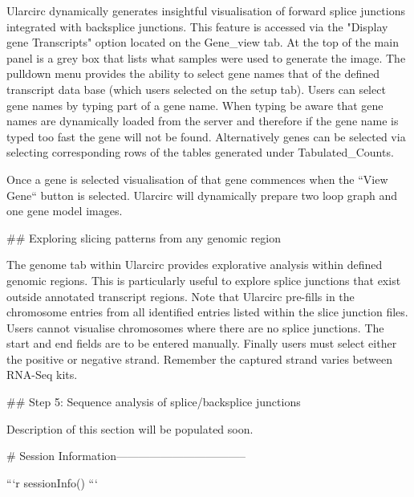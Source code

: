 Ularcirc dynamically generates insightful visualisation of forward splice junctions integrated with backsplice junctions. This feature is accessed via the "Display gene Transcripts" option located on the Gene_view tab. At the top of the main panel is a grey box that lists what samples were used to generate the image. The pulldown menu provides the ability to select gene names that of the defined transcript data base (which users selected on the setup tab). Users can select gene names by typing part of a gene name. When typing  be aware that gene names are dynamically loaded from the server and therefore if the gene name is typed too fast the gene will not be found.  Alternatively genes can be selected via selecting corresponding rows of the tables generated under Tabulated_Counts. 

Once a gene is selected visualisation of that gene commences when the ``View Gene`` button is selected. Ularcirc will dynamically prepare two loop graph and one gene model images.


## Exploring slicing patterns from any genomic region

The genome tab within Ularcirc provides explorative analysis within defined genomic regions. This is particularly useful to explore splice junctions that exist outside annotated transcript regions. Note that Ularcirc pre-fills in the chromosome entries from all identified entries listed within the slice junction files. Users cannot visualise chromosomes where there are no splice junctions. The start and end fields are to be entered manually. Finally users must select either the positive or negative strand. Remember the captured strand varies between RNA-Seq kits.

## Step 5: Sequence analysis of splice/backsplice junctions

Description of this section will be populated soon.

# Session Information-----------------------------------


```r
sessionInfo()
```

